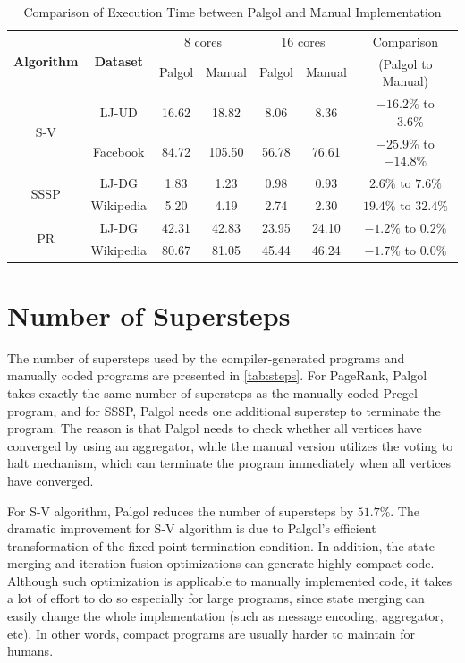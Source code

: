 \documentclass{sokendai_thesis} %
\begin{document}
\begin{table}[t]
 \centering
 \caption{Comparison of Execution Time between Palgol and Manual Implementation}
 \label{tab:exec}
 \begin{tabular}{c|c||c|c||c|c||c}
  \hline
  \multirow{2}{*}{\textbf{Algorithm}} & \multirow{2}{*}{\textbf{Dataset}} & \multicolumn{2}{c||}{8 cores} 
  & \multicolumn{2}{c||}{16 cores} & Comparison \\
  \cline{3-6}
  & & Palgol & Manual & Palgol & Manual & (Palgol to Manual) \\
  \hline\hline
  \multirow{2}{*}{S-V} & LJ-UD & 16.62 & 18.82 & 8.06 & 8.36 & $-16.2\%$ to $-3.6\%$ \\
  \cline{2-7}
  & Facebook & 84.72 & 105.50 & 56.78 & 76.61 & $-25.9\%$ to $-14.8\%$ \\
  \hline
  \multirow{2}{*}{SSSP} & LJ-DG & 1.83 & 1.23 & 0.98 & 0.93 & $2.6\%$ to $7.6\%$ \\
  \cline{2-7}
  & Wikipedia & 5.20 & 4.19 & 2.74 & 2.30 & $19.4\%$ to $32.4\%$ \\
  \hline
  \multirow{2}{*}{PR} & LJ-DG & 42.31 & 42.83 & 23.95 & 24.10 & $-1.2\%$ to $0.2\%$ \\
  \cline{2-7}
  & Wikipedia & 80.67 & 81.05 & 45.44 & 46.24 & $-1.7\%$ to $0.0\%$ \\
  \hline
 \end{tabular}
\end{table}

\section{Number of Supersteps}

The number of supersteps used by the compiler-generated programs and manually coded programs are presented in \autoref{tab:steps}.
For PageRank, Palgol takes exactly the same number of supersteps as the manually coded Pregel program, and for SSSP, Palgol needs one additional superstep to terminate the program.
The reason is that Palgol needs to check whether all vertices have converged by using an aggregator, while the manual version utilizes the voting to halt mechanism, which can terminate the program immediately when all vertices have converged.

For S-V algorithm, Palgol reduces the number of supersteps by $51.7\%$.
The dramatic improvement for S-V algorithm is due to Palgol's efficient transformation of the fixed-point termination condition.
In addition, the state merging and iteration fusion optimizations can generate highly compact code.
Although such optimization is applicable to manually implemented code, it takes a lot of effort to do so especially for large programs, since state merging can easily change the whole implementation (such as message encoding, aggregator, etc).
In other words, compact programs are usually harder to maintain for humans.
\end{document}
